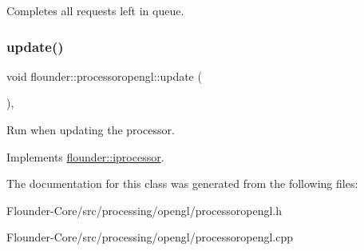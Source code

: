 Completes all requests left in queue. 

\mbox{\label{classflounder_1_1processoropengl_ad3ca7ada749d785e44fa2b536839f684}} 
\subsubsection{\texorpdfstring{update()}{update()}}
{\footnotesize\ttfamily void flounder\+::processoropengl\+::update (\begin{DoxyParamCaption}{ }\end{DoxyParamCaption})\hspace{0.3cm}{\ttfamily [override]}, {\ttfamily [virtual]}}



Run when updating the processor. 



Implements \hyperlink{classflounder_1_1iprocessor_ad2edfece3465ec3dbe0a5feac26bdbc3}{flounder\+::iprocessor}.



The documentation for this class was generated from the following files\+:\begin{DoxyCompactItemize}
\item 
Flounder-\/\+Core/src/processing/opengl/processoropengl.\+h\item 
Flounder-\/\+Core/src/processing/opengl/processoropengl.\+cpp\end{DoxyCompactItemize}
